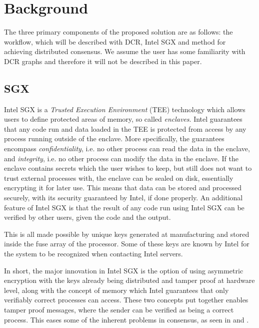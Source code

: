 \documentclass[12pt]{article}
\begin{document}
	\section{Background}
	The three primary components of the proposed solution are as follows: the workflow, which will be described with DCR, Intel SGX and method for achieving distributed consensus.
	We assume the user has some familiarity with DCR graphs and therefore it will not be described in this paper.	

		\subsection{SGX}
		Intel SGX is a \textit{Trusted Execution Environment} (TEE) technology which allows users to define protected areas of memory, so called \textit{enclaves}.
		Intel guarantees \cite{sgx} that any code run and data loaded in the TEE is protected from access by any process running outside of the enclave.
		More specifically, the guarantees encompass \textit{confidentiality}, i.e. no other process can read the data in the enclave, and \textit{integrity}, i.e. no other process can modify the data in the enclave. 
		If the enclave contains secrets which the user wishes to keep, but still does not want to trust external processes with, the enclave can be sealed on disk, essentially encrypting it for later use.
		This means that data can be stored and processed securely, with its security guaranteed by Intel, if done properly.
		An additional feature of Intel SGX is that the result of any code run using Intel SGX can be verified by other users, given the code and the output.

		This is all made possible by unique keys generated at manufacturing and stored inside the fuse array of the processor.
		Some of these keys are known by Intel for the system to be recognized when contacting Intel servers.

		In short, the major innovation in Intel SGX is the option of using asymmetric encryption with the keys already being distributed and tamper proof at hardware level, along with the concept of memory which Intel guarantees that only verifiably correct processes can access.
		These two concepts put together enables tamper proof messages, where the sender can be verified as being a correct process.
		This eases some of the inherent problems in consensus, as seen in \cite{fastbft} and \cite{poet}.
\end{document}
